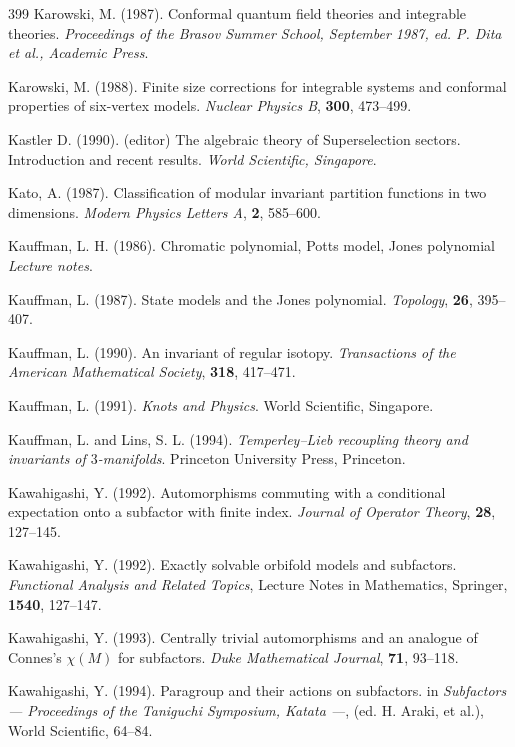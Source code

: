\documentclass[12pt]{article}
\theoremstyle{plain}
\theoremstyle{definition}
\numberwithin{equation}{section}
\begin{document}
\begin{thebibliography} {399}
Karowski, M. (1987).
Conformal quantum field theories and integrable theories.
{\em Proceedings of the Brasov Summer School, September
1987, ed. P. Dita et al., Academic Press}.

Karowski, M. (1988).
Finite size corrections for integrable systems and conformal
properties of six-vertex models.
{\em Nuclear Physics B}, {\bf 300}, 473--499.

Kastler D. (1990).
(editor) The algebraic theory of Superselection sectors.
Introduction and recent results.
{\em World Scientific, Singapore}.

Kato, A. (1987).
Classification of modular invariant partition
functions in two dimensions.
{\em Modern Physics Letters A}, {\bf 2}, 585--600.

Kauffman, L. H. (1986).
Chromatic polynomial, Potts model, Jones polynomial
{\em Lecture notes}.

Kauffman, L. (1987).
State models and the Jones polynomial.
{\em Topology}, {\bf 26}, 395--407.

Kauffman, L. (1990).
An invariant of regular isotopy.
{\em Transactions of the American Mathematical Society}, 
{\bf 318}, 417--471.

Kauffman, L. (1991).
{\em Knots and Physics}.
World Scientific, Singapore.

Kauffman, L. and Lins, S. L. (1994).
{\em Temperley--Lieb recoupling theory and invariants of $3$-manifolds}.
Princeton University Press, Princeton.

Kawahigashi, Y. (1992).
Automorphisms commuting with a conditional expectation
onto a subfactor with finite index.
{\em Journal of Operator Theory},
{\bf 28}, 127--145.

Kawahigashi, Y. (1992).
Exactly solvable orbifold models and subfactors.
{\em Functional Analysis and Related Topics},
Lecture Notes in Mathematics, Springer, {\bf 1540}, 127--147.

Kawahigashi, Y. (1993).
Centrally trivial automorphisms and an analogue of
Connes's $\chi(M)$ for subfactors.
{\em Duke Mathematical Journal}, {\bf 71}, 93--118.

Kawahigashi, Y. (1994).
Paragroup and their actions on subfactors.
in {\em Subfactors ---
Proceedings of the Taniguchi Symposium, Katata ---},
(ed. H. Araki, et al.),
World Scientific, 64--84.


\end{thebibliography}
\end{document}
